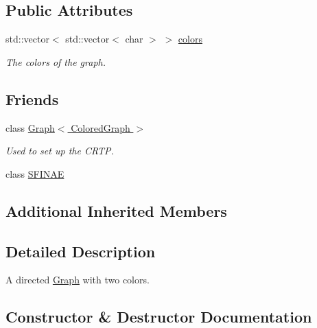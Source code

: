 \subsection*{Public Attributes}
\begin{DoxyCompactItemize}
\item 
std\+::vector$<$ std\+::vector$<$ char $>$ $>$ \hyperlink{classMackey_1_1ColoredGraph_a29fbdcaf9f94f0f5d48e5390ba49b338}{colors}
\begin{DoxyCompactList}\small\item\em The colors of the graph. \end{DoxyCompactList}\end{DoxyCompactItemize}
\subsection*{Friends}
\begin{DoxyCompactItemize}
\item 
class \hyperlink{classMackey_1_1ColoredGraph_a2debfc8158c19d7b93550156a3e2676a}{Graph$<$ Colored\+Graph $>$}
\begin{DoxyCompactList}\small\item\em Used to set up the C\+R\+TP. \end{DoxyCompactList}\item 
class \hyperlink{classMackey_1_1ColoredGraph_a4a5a1a2093897e5ce4cabec8f82f5c9c}{S\+F\+I\+N\+AE}
\end{DoxyCompactItemize}
\subsection*{Additional Inherited Members}


\subsection{Detailed Description}
A directed \hyperlink{classMackey_1_1Graph}{Graph} with two colors. 

\subsection{Constructor \& Destructor Documentation}
\mbox{\label{classMackey_1_1ColoredGraph_a367055b4a615119cc767a738f6e9e719}} 
